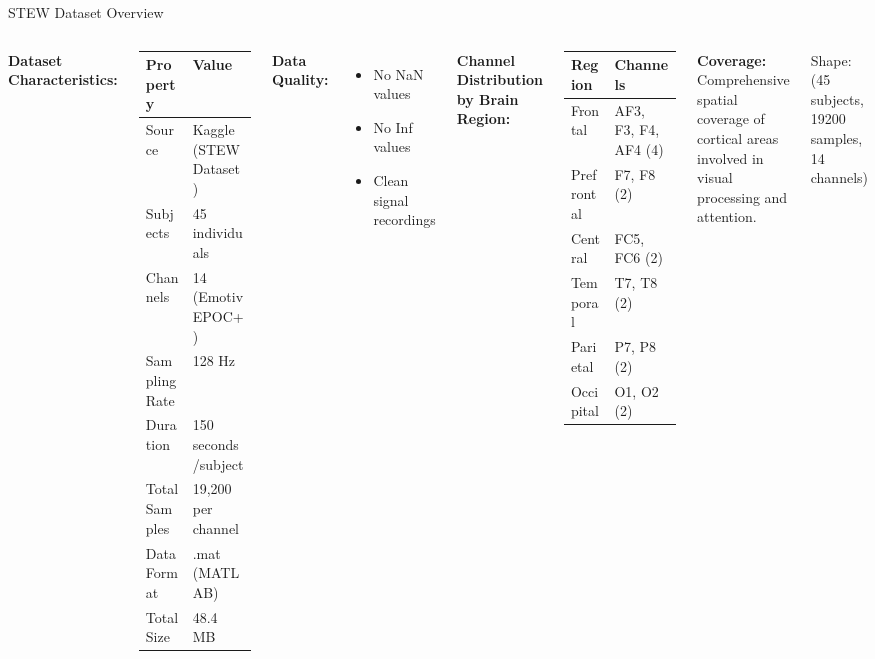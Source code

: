 \documentclass[aspectratio=169]{beamer}
\begin{document}
\begin{frame}{STEW Dataset Overview}
\begin{columns}[T]
\textbf{Dataset Characteristics:}

\begin{table}[h]
\small
\begin{tabular}{@{}ll@{}}
\toprule
\textbf{Property} & \textbf{Value} \\
\midrule
Source & Kaggle (STEW Dataset) \\
Subjects & 45 individuals \\
Channels & 14 (Emotiv EPOC+) \\
Sampling Rate & 128 Hz \\
Duration & 150 seconds/subject \\
Total Samples & 19,200 per channel \\
Data Format & .mat (MATLAB) \\
Total Size & 48.4 MB \\
\bottomrule
\end{tabular}
\end{table}

\vspace{3mm}

\textbf{Data Quality:}
\begin{itemize}
    \item No NaN values
    \item No Inf values
    \item Clean signal recordings
\end{itemize}

\textbf{Channel Distribution by Brain Region:}

\begin{table}[h]
\small
\begin{tabular}{@{}ll@{}}
\toprule
\textbf{Region} & \textbf{Channels} \\
\midrule
Frontal & AF3, F3, F4, AF4 (4) \\
Prefrontal & F7, F8 (2) \\
Central & FC5, FC6 (2) \\
Temporal & T7, T8 (2) \\
Parietal & P7, P8 (2) \\
Occipital & O1, O2 (2) \\
\bottomrule
\end{tabular}
\end{table}

\vspace{3mm}

\textbf{Coverage:} Comprehensive spatial coverage of cortical areas involved in visual processing and attention.

\vspace{3mm}

\begin{center}
\colorbox{accent!20}{\parbox{0.9\textwidth}{\centering
\small Shape: (45 subjects, 19200 samples, 14 channels)
}}
\end{center}
\end{columns}
\end{frame}
\end{document}
